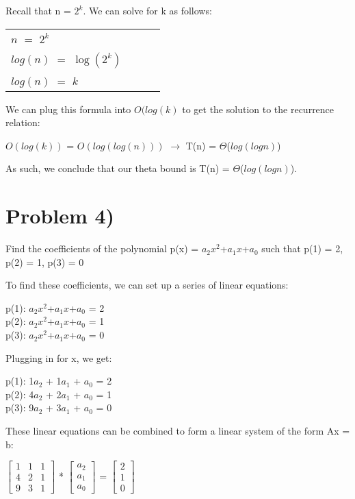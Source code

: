 \documentclass{article}
\begin{document}
Recall that n = $2^k$. We can solve for k as follows: 

\begin{center}
	\begin{tabular}{l l l l}
		$n$ $=$ $2^k$ \\
		$log(n)$ $=$ $\log(2^k)$ \\
		$log(n)$ $=$ $k$
	\end{tabular}
\end{center}

We can plug this formula into $O(log(k)$ to get the solution to the recurrence relation:

\begin{center}
$O(log(k))$ = $O(log(log(n)))$ $\rightarrow$ T(n) = $\Theta$($log(logn)$)
\end{center}

As such, we conclude that our theta bound is T(n) = $\Theta$($log(logn)$).

\section*{Problem 4)} 
Find the coefficients of the polynomial p(x) = $a_2 x^2$+$a_1 x$+$a_0$ such that p(1) = 2, p(2) = 1, p(3) = 0

To find these coefficients, we can set up a series of linear equations:

\begin{center}

p(1): $a_2 x^2$+$a_1 x$+$a_0$ = 2 \\
p(2): $a_2 x^2$+$a_1 x$+$a_0$ = 1 \\
p(3): $a_2 x^2$+$a_1 x$+$a_0$ = 0 \\

\end{center}

Plugging in for x, we get:

\begin{center}

p(1): 1$a_2$ + 1$a_1$ + $a_0$ = 2 \\
p(2): 4$a_2$ + 2$a_1$ + $a_0$ = 1 \\
p(3): 9$a_2$ + 3$a_1$ + $a_0$ = 0 \\

\end{center}
 

These linear equations can be combined to form a linear system of the form Ax = b: 



\begin{center}
$\begin{bmatrix}
 1&1&1\\
 4&2&1\\
 9&3&1
\end{bmatrix}$
*
$\begin{bmatrix}
a_2\\
a_1\\
a_0
\end{bmatrix}$
= 
$\begin{bmatrix}
2\\
1\\
0
\end{bmatrix}$
\end{center}
\end{document}
